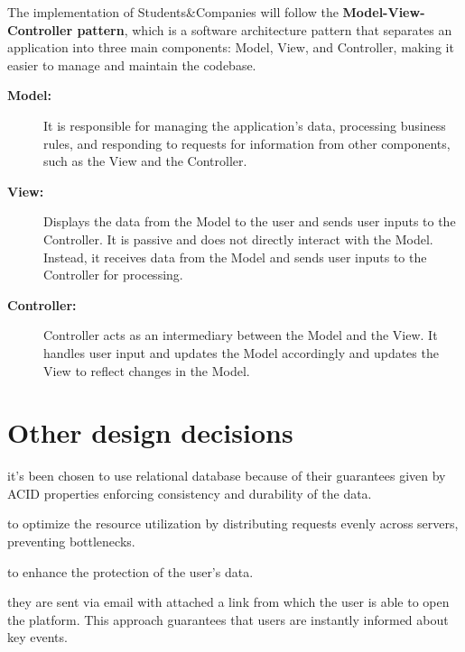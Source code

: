 The implementation of Students\&Companies will follow the \textbf{Model-View-Controller pattern}, which is a software architecture pattern that separates an application into three main components: Model, View, and Controller, making it easier to manage and maintain the codebase.
\begin{description}
    \item[\textbf{Model:}] It is responsible for managing the application’s data, processing business rules, and responding to requests for information from other components, such as the View and the Controller.
    \item[\textbf{View:}] Displays the data from the Model to the user and sends user inputs to the Controller. It is passive and does not directly interact with the Model. Instead, it receives data from the Model and sends user inputs to the Controller for processing.
    \item[\textbf{Controller:}] Controller acts as an intermediary between the Model and the View. It handles user input and updates the Model accordingly and updates the View to reflect changes in the Model. 
\end{description}

\section{Other design decisions}
\begin{description}[leftmargin=0pt]
    \item[Relational DBMS:]
          it's been chosen to use relational database because of their guarantees given by ACID properties enforcing consistency and durability of the data.
    \item[Load balancing:] to optimize the resource utilization by distributing requests evenly across servers, preventing bottlenecks. 
    \item[Firewall:] to enhance the protection of the user's data.
    \item[Notifications:] they are sent via email with attached a link from which the user is able to open the platform. This approach guarantees that users are instantly informed about key events. 
\end{description}
